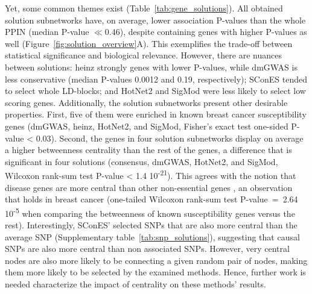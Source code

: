 \documentclass[twocolumn, 11pt]{article}
\begin{document}
Yet, some common themes exist (Table~\ref{tab:gene_solutions}). All obtained solution subnetworks have, on average, lower association P-values than the whole PPIN (median P-value $\ll 0.46$), despite containing genes with higher P-values as well (Figure~\ref{fig:solution_overview}A). This exemplifies the trade-off between statistical significance and biological relevance. However, there are nuances between solutions: heinz strongly genes with lower P-values, while dmGWAS is less conservative (median P-values 0.0012 and 0.19, respectively); SConES tended to select whole LD-blocks; and HotNet2 and SigMod were less likely to select low scoring genes. Additionally, the solution subnetworks present other desirable properties. First, five of them were enriched in known breast cancer susceptibility genes (dmGWAS, heinz, HotNet2, and SigMod, Fisher's exact test one-sided P-value < 0.03). Second, the genes in four solution subnetworks display on average a higher betweenness centrality than the rest of the genes, a difference that is significant in four solutions (consensus, dmGWAS, HotNet2, and SigMod, Wilcoxon rank-sum test P-value < 1.4 \texttimes{} 10\textsuperscript{-21}). This agrees with the notion that disease genes are more central than other non-essential genes \cite{pinero_uncovering_2016}, an observation that holds in breast cancer (one-tailed Wilcoxon rank-sum test P-value~=~2.64 \texttimes{} 10\textsuperscript{-5} when comparing the betweenness of known susceptibility genes versus the rest). Interestingly, SConES' selected SNPs that are also more central than the average SNP (Supplementary table~\ref{tab:snp_solutions}), suggesting that causal SNPs are also more central than non associated SNPs. However, very central nodes are also more likely to be connecting a given random pair of nodes, making them more likely to be selected by the examined methods. Hence, further work is needed characterize the impact of centrality on these methods' results.
\end{document}
